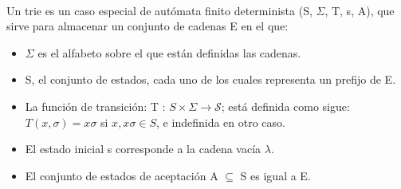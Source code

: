 \documentclass[es]{ifirak}
\begin{document}
\paragraph{}
\large{Un trie es un caso especial de autómata finito determinista (S,  $\Sigma$, T, s, A), que sirve para almacenar un conjunto de cadenas E en el que:

\begin{itemize}
	\item $\Sigma$ es el alfabeto sobre el que están definidas las cadenas.
	
	\item S, el conjunto de estados, cada uno de los cuales representa un prefijo de E.
	
	\item La función de transición: T : $S \times  \Sigma \to \mathcal S$; está definida como sigue: $ T(x,\sigma)=x\sigma$  si  $x, x\sigma \in S$, e indefinida en otro caso.
	
	\item El estado inicial s corresponde a la cadena vacía $\lambda$.
	
	\item El conjunto de estados de aceptación A $\subseteq$ S es igual a E.
	
\end{itemize}
	}
\end{document}
